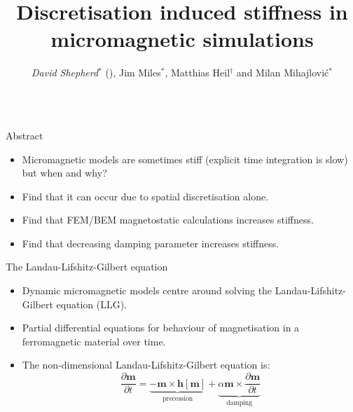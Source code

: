 \documentclass[final]{beamer} %
\title[sd_stiffness]{\Huge{Discretisation induced stiffness in \\ \vspace{0.3em} micromagnetic simulations}}
\author[David Shepherd]{
  \textit{David Shepherd}$^*$ (\texttt{\email{}}), Jim Miles$^*$, Matthias Heil$^\dagger$ and Milan Mihajlovi\'{c}$^*$}
\institute{$*$ NEST Group, School of Computer Science, \uomaddr{} \\
  $\dagger$ School of Mathematics, \uomaddr{}}
\newlength{\wideitemsep}
\let\olditem\item
\renewcommand{\item}{\setlength{\itemsep}{\wideitemsep}\olditem}
\newlength{\columnheight}
\newcommand{\pd}[2]{\frac{\partial #1}{\partial #2}}
\newcommand{\mv}{\mathbf{m}}
\newcommand{\hv}{\mathbf{h}}
\begin{document}
\begin{frame}

  \begin{columns}

    \begin{column}{0.47\textwidth}

      \parbox[t][\columnheight]{\textwidth}{

        \begin{block}{Abstract}  %
            \begin{itshape}
              \begin{itemize}
              \item Micromagnetic models are sometimes stiff (explicit time integration is slow) but when and why?
              \item Find that it can occur due to spatial discretisation alone.
              \item Find that FEM/BEM magnetostatic calculations increases stiffness.
              \item Find that decreasing damping parameter increases stiffness.
              \end{itemize}
            \end{itshape}
        \end{block}

        \vfill

        \begin{block}{\boxnumber The Landau-Lifshitz-Gilbert equation}
          \begin{itemize}
          \item Dynamic micromagnetic models centre around solving the
            Landau-Lifshitz-Gilbert equation (LLG).

          \item Partial differential equations for behaviour of magnetisation in a
            ferromagnetic material over time.

          \item The non-dimensional Landau-Lifshitz-Gilbert equation is:
            \begin{equation}
              \pd{\mv}{t} = \underbrace{-\mv \times \hv[\mv]}_{\text{precession}}
              + \underbrace{\alpha \mv \times \pd{\mv}{t}}_{\text{damping}}
            \end{equation}


\end{itemize}
\end{block}}
\end{column}
\end{columns}
\end{frame}
\end{document}
